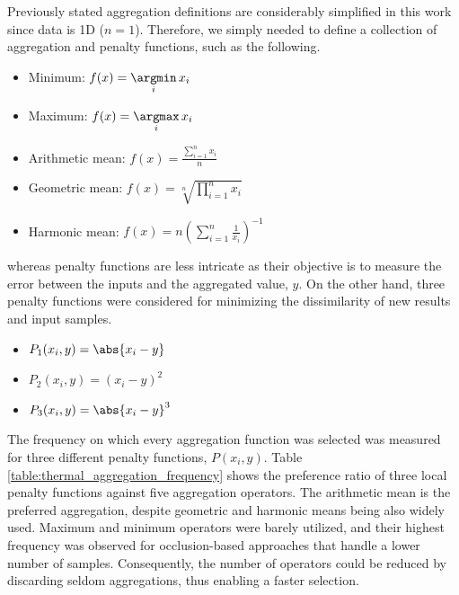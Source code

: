 Previously stated aggregation definitions are considerably simplified in this work since data is 1D ($n = 1$). Therefore, we simply needed to define a collection of aggregation and penalty functions, such as the following.
\begin{itemize}
    \item Minimum: $f(x) = \underset{i}{\argmin}\, x_i$
    \item Maximum: $f(x) = \underset{i}{\argmax}\, x_i$
    \item Arithmetic mean: $f(x) = \frac{\sum_{i=1}^{n} x_i}{n}$
    \item Geometric mean: $f(x) = \sqrt[n]{\prod_{i=1}^{n} x_i}$
    \item Harmonic mean: $f(x) = n\left( \sum_{i=1}^{n} \frac{1}{x_i} \right)^{-1}$
\end{itemize}
whereas penalty functions are less intricate as their objective is to measure the error between the inputs and the aggregated value, $y$. On the other hand, three penalty functions \cite{paternain_color_2012} were considered for minimizing the dissimilarity of new results and input samples. 
\begin{itemize}
    \item $P_1(x_i, y) = \abs{x_i - y}$
    \item $P_2(x_i, y) = (x_i - y)^2$
    \item $P_3(x_i, y) = \abs{x_i - y}^3$
\end{itemize}

The frequency on which every aggregation function was selected was measured for three different penalty functions, $P(x_i, y)$. Table \ref{table:thermal_aggregation_frequency} shows the preference ratio of three local penalty functions against five aggregation operators. The arithmetic mean is the preferred aggregation, despite geometric and harmonic means being also widely used. Maximum and minimum operators were barely utilized, and their highest frequency was observed for occlusion-based approaches that handle a lower number of samples. Consequently, the number of operators could be reduced by discarding seldom aggregations, thus enabling a faster selection.

